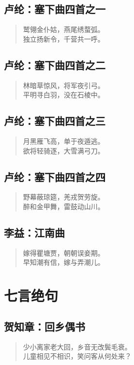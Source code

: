\documentclass[12pt,oneside]{book}
\newenvironment{shici}{%
\begin{verse}\centering\yanti\large\hspace{12pt}}{\end{verse}}
\begin{document}
\begin{common-format}
\chapter{卢纶：塞下曲四首之一}
\begin{shici}
鹫翎金仆姑，燕尾绣蝥弧。\\
独立扬新令，千营共一呼。
\end{shici}

\chapter{卢纶：塞下曲四首之二}
\begin{shici}
林暗草惊风，将军夜引弓。\\
平明寻白羽，没在石棱中。
\end{shici}

\chapter{卢纶：塞下曲四首之三}
\begin{shici}
月黑雁飞高，单于夜遁逃。\\
欲将轻骑逐，大雪满弓刀。
\end{shici}

\chapter{卢纶：塞下曲四首之四}
\begin{shici}
野幕蔽琼筵，羌戎贺劳旋。\\
醉和金甲舞，雷鼓动山川。
\end{shici}

\chapter{李益：江南曲}
\begin{shici}
嫁得瞿塘贾，朝朝误妾期。\\
早知潮有信，嫁与弄潮儿。
\end{shici}


\part{七言绝句}
\chapter{贺知章：回乡偶书}
\begin{shici}
少小离家老大回，乡音无改鬓毛衰。\\
儿童相见不相识，笑问客从何处来？
\end{shici}


\end{common-format}
\end{document}
